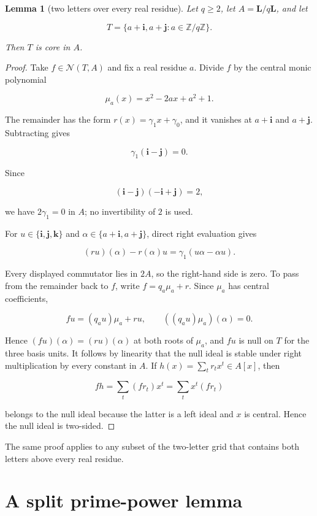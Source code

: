 \documentclass[11pt]{article}
\newtheorem{lemma}[theorem]{Lemma}
\theoremstyle{remark}
\numberwithin{equation}{section}
\begin{document}
\begin{lemma}[two letters over every real residue]

Let $q\ge2$, let $A=\mathbf L/q\mathbf L$, and let

\[
T=\{a+\mathbf i,a+\mathbf j:a\in\mathbb Z/q\mathbb Z\}.
\]

Then $T$ is core in $A$.

\end{lemma}
\begin{proof}

Take $f\in\mathcal N(T,A)$ and fix a real residue $a$. Divide $f$ by the
central monic polynomial

\[
\mu_a(x)=x^2-2ax+a^2+1.
\]

The remainder has the form $r(x)=\gamma_1x+\gamma_0$, and it vanishes at
$a+\mathbf i$ and $a+\mathbf j$. Subtracting gives

\[
\gamma_1(\mathbf i-\mathbf j)=0.
\]

Since

\[
(\mathbf i-\mathbf j)(-\mathbf i+\mathbf j)=2,
\]

we have $2\gamma_1=0$ in $A$; no invertibility of $2$ is used.

For $u\in\{\mathbf i,\mathbf j,\mathbf k\}$ and
$\alpha\in\{a+\mathbf i,a+\mathbf j\}$, direct right evaluation gives

\[
(ru)(\alpha)-r(\alpha)u
=\gamma_1(u\alpha-\alpha u).
\]

Every displayed commutator lies in $2A$, so the right-hand side is zero.
To pass from the remainder back to $f$, write $f=q_a\mu_a+r$. Since
$\mu_a$ has central coefficients,

\[
fu=(q_au)\mu_a+ru,
\qquad
((q_au)\mu_a)(\alpha)=0.
\]

Hence $(fu)(\alpha)=(ru)(\alpha)$ at both roots of $\mu_a$, and $fu$ is
null on $T$ for the three basis units. It follows by linearity
that the null ideal is stable under right multiplication by every constant in
$A$. If $h(x)=\sum_t r_tx^t\in A[x]$, then

\[
fh=\sum_t(fr_t)x^t=\sum_tx^t(fr_t)
\]

belongs to the null ideal because the latter is a left ideal and $x$ is
central. Hence the null ideal is two-sided.
\end{proof}

The same proof applies to any subset of the two-letter grid that contains both
letters above every real residue.

\section{A split prime-power lemma}
\end{document}
